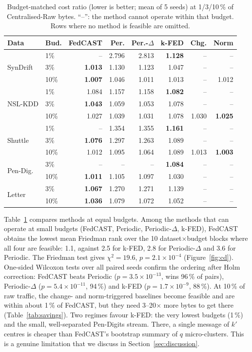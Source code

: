 \begin{table}[t]
\centering\small
\caption{Budget-matched cost ratio (lower is better; mean of 5 seeds) at 1/3/10\,\% of Centralised-Raw bytes. ``--'': the method cannot operate within that budget. Rows where no method is feasible are omitted.}\label{tab:matched}
\setlength{\tabcolsep}{2.4pt}
\begin{tabular}{@{}llrrrrrr@{}}
\toprule
Data & Bud. & \textbf{FedCAST} & Per. & Per.-$\Delta$ & k-FED & Chg. & Norm\\
\midrule
\multirow{3}{*}{SynDrift} & 1\% & -- & 2.796 & 2.813 & \textbf{1.128} & -- & --\\
 & 3\% & \textbf{1.013} & 1.130 & 1.123 & 1.047 & -- & --\\
 & 10\% & \textbf{1.007} & 1.046 & 1.011 & 1.013 & -- & 1.012\\
\multirow{3}{*}{NSL-KDD} & 1\% & 1.084 & 1.157 & 1.158 & \textbf{1.082} & -- & --\\
 & 3\% & \textbf{1.043} & 1.059 & 1.053 & 1.078 & -- & --\\
 & 10\% & 1.027 & 1.039 & 1.031 & 1.078 & 1.030 & \textbf{1.025}\\
\multirow{3}{*}{Shuttle} & 1\% & -- & 1.354 & 1.355 & \textbf{1.161} & -- & --\\
 & 3\% & \textbf{1.076} & 1.297 & 1.263 & 1.089 & -- & --\\
 & 10\% & 1.012 & 1.095 & 1.064 & 1.089 & 1.013 & \textbf{1.003}\\
\multirow{2}{*}{Pen-Dig.} & 3\% & -- & -- & -- & \textbf{1.084} & -- & --\\
 & 10\% & \textbf{1.011} & 1.105 & 1.097 & 1.030 & -- & --\\
\multirow{2}{*}{Letter} & 3\% & \textbf{1.067} & 1.270 & 1.271 & 1.139 & -- & --\\
 & 10\% & \textbf{1.036} & 1.079 & 1.072 & 1.052 & -- & --\\
\bottomrule
\end{tabular}
\end{table}

Table~\ref{tab:matched} compares methods at equal budgets. Among the methods that can operate at small budgets (FedCAST, Periodic, Periodic-$\Delta$, k-FED), FedCAST obtains the lowest mean Friedman rank over the 10 dataset$\times$budget blocks where all four are feasible: 1.1, against 2.5 for k-FED, 2.8 for Periodic-$\Delta$ and 3.6 for Periodic. The Friedman test gives $\chi^2{=}19.6$, $p{=}2.1{\times}10^{-4}$ (Figure~\ref{fig:cd}). One-sided Wilcoxon tests over all paired seeds confirm the ordering after Holm correction: FedCAST beats Periodic ($p{=}3.5{\times}10^{-13}$, wins 96\,\% of pairs), Periodic-$\Delta$ ($p{=}5.4{\times}10^{-11}$, 94\,\%) and k-FED ($p{=}1.7{\times}10^{-9}$, 88\,\%). At 10\,\% of raw traffic, the change- and norm-triggered baselines become feasible and are within about 1\,\% of FedCAST, but they need 3--20$\times$ more bytes to get there (Table~\ref{tab:savings}). Two regimes favour k-FED: the very lowest budgets (1\,\%) and the small, well-separated Pen-Digits stream. There, a single message of $k'$ centres is cheaper than FedCAST's bootstrap summary of $q$ micro-clusters. This is a genuine limitation that we discuss in Section~\ref{sec:discussion}.

